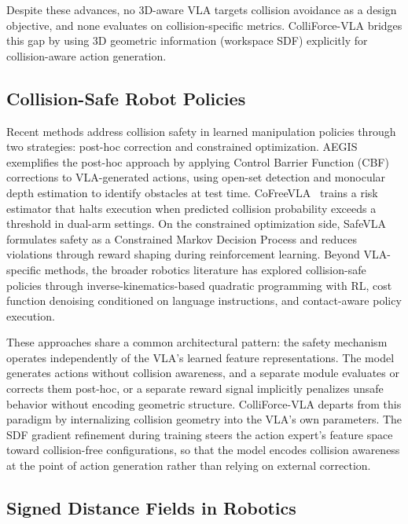 Despite these advances, no 3D-aware VLA targets collision avoidance as a design objective, and none evaluates on collision-specific metrics. ColliForce-VLA bridges this gap by using 3D geometric information (workspace SDF) explicitly for collision-aware action generation.

\subsection{Collision-Safe Robot Policies}

Recent methods address collision safety in learned manipulation policies through two strategies: post-hoc correction and constrained optimization. AEGIS~\cite{hu2025vlsa} exemplifies the post-hoc approach by applying Control Barrier Function (CBF) corrections to VLA-generated actions, using open-set detection and monocular depth estimation to identify obstacles at test time. CoFreeVLA~\cite{cofreeevla2026} trains a risk estimator that halts execution when predicted collision probability exceeds a threshold in dual-arm settings. On the constrained optimization side, SafeVLA~\cite{zhang2025safevla} formulates safety as a Constrained Markov Decision Process and reduces violations through reward shaping during reinforcement learning. Beyond VLA-specific methods, the broader robotics literature has explored collision-safe policies through inverse-kinematics-based quadratic programming with RL, cost function denoising conditioned on language instructions, and contact-aware policy execution.

These approaches share a common architectural pattern: the safety mechanism operates independently of the VLA's learned feature representations. The model generates actions without collision awareness, and a separate module evaluates or corrects them post-hoc, or a separate reward signal implicitly penalizes unsafe behavior without encoding geometric structure. ColliForce-VLA departs from this paradigm by internalizing collision geometry into the VLA's own parameters. The SDF gradient refinement during training steers the action expert's feature space toward collision-free configurations, so that the model encodes collision awareness at the point of action generation rather than relying on external correction.

\subsection{Signed Distance Fields in Robotics}

